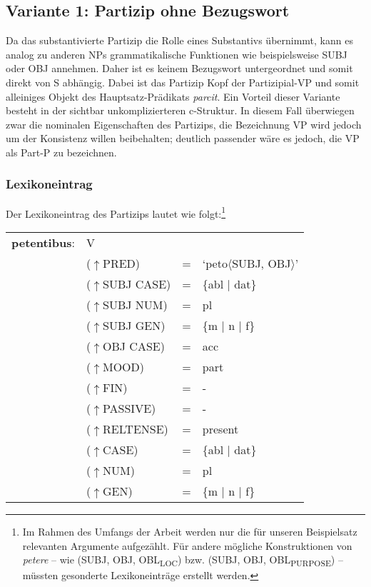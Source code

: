 \documentclass[12pt,a4paper]{article}
\begin{document}
\subsection{Variante 1: Partizip ohne Bezugswort}
Da das substantivierte Partizip die Rolle eines Substantivs übernimmt, kann es analog zu anderen NPs grammatikalische Funktionen wie beispielsweise SUBJ oder OBJ annehmen. Daher ist es keinem Bezugswort untergeordnet und somit direkt von S abhängig. Dabei ist das Partizip Kopf der Partizipial-VP und somit alleiniges Objekt des Hauptsatz-Prädikats \textit{parcit}. Ein Vorteil dieser Variante besteht in der sichtbar unkomplizierteren c-Struktur. In diesem Fall überwiegen zwar die nominalen Eigenschaften des Partizips, die Bezeichnung VP wird jedoch um der Konsistenz willen beibehalten; deutlich passender wäre es jedoch, die VP als Part-P zu bezeichnen.

\subsubsection{Lexikoneintrag}
Der Lexikoneintrag des Partizips lautet wie folgt:\footnote{Im Rahmen des Umfangs der Arbeit werden nur die für unseren Beispielsatz relevanten Argumente aufgezählt. Für andere mögliche Konstruktionen von \textit{petere} -- wie (SUBJ, OBJ, OBL\textsubscript{LOC}) bzw. (SUBJ, OBJ, OBL\textsubscript{PURPOSE}) -- müssten gesonderte Lexikoneinträge erstellt werden.}
\begin{singlespace}
\begin{tabular}{ l  l  l  l  } 
\textbf{petentibus}: & \: V \\
$\qquad$ & \:  ($\uparrow$PRED) & = & `peto$\langle$SUBJ, OBJ$\rangle$' \\
$\qquad$ & \:  ($\uparrow$SUBJ CASE) & = & \{abl $\mid$ dat\} \\
$\qquad$ & \:  ($\uparrow$SUBJ NUM) & = & pl \\
$\qquad$ & \:  ($\uparrow$SUBJ GEN) & = & \{m $\mid$ n $\mid$ f\} \\
$\qquad$ & \:  ($\uparrow$OBJ CASE) & = & acc \\
$\qquad$ & \:  ($\uparrow$MOOD) & = & part\\
$\qquad$ & \:  ($\uparrow$FIN) & = & - \\
$\qquad$ & \:  ($\uparrow$PASSIVE) & = & - \\
$\qquad$ & \:  ($\uparrow$RELTENSE) & = & present \\ 
$\qquad$ & \:  ($\uparrow$CASE) & = & \{abl $\mid$ dat\} \\
$\qquad$ & \:  ($\uparrow$NUM) & = & pl \\
$\qquad$ & \:  ($\uparrow$GEN) & = & \{m $\mid$ n $\mid$ f\} \\
\end{tabular}
\newline
\end{singlespace}
\end{document}
